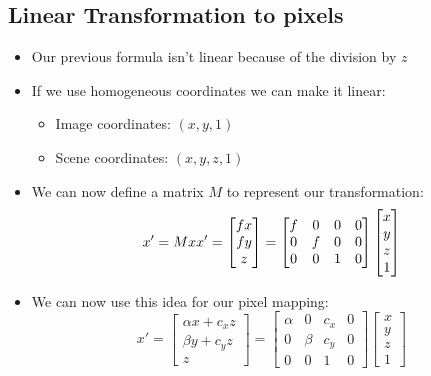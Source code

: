 \subsection{Linear Transformation to pixels}
\begin{itemize}
	\item Our previous formula isn't linear because of the division by $z$
	\item If we use homogeneous coordinates we can make it linear:
	\begin{itemize}
		\item Image coordinates: $(x, y, 1)$
		\item Scene coordinates: $(x, y, z, 1)$
	\end{itemize}
	\item We can now define a matrix $M$ to represent our transformation:
	$$x'=Mx\\
	x'=\begin{bmatrix}
		fx \\ fy \\z
	\end{bmatrix}=\begin{bmatrix}
		f & 0 & 0 & 0 \\
		0 & f & 0 & 0 \\
		0 & 0 & 1 & 0
	\end{bmatrix}\begin{bmatrix}
		x \\ y \\ z \\ 1
	\end{bmatrix}$$
	\item We can now use this idea for our pixel mapping:
	$$x'=\begin{bmatrix}
		\alpha x+c_x z \\ \beta y + c_y z \\ z
	\end{bmatrix} = \begin{bmatrix}
		\alpha & 0 & c_x & 0\\
		0 & \beta & c_y & 0 \\
		0 & 0 & 1 & 0
	\end{bmatrix}\begin{bmatrix}
		x \\ y \\ z \\ 1
	\end{bmatrix}$$
\end{itemize}

